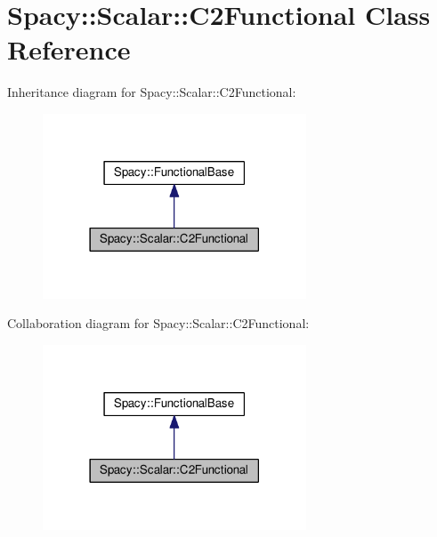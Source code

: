 \hypertarget{classSpacy_1_1Scalar_1_1C2Functional}{\section{Spacy\-:\-:Scalar\-:\-:C2\-Functional Class Reference}
\label{classSpacy_1_1Scalar_1_1C2Functional}
}


Inheritance diagram for Spacy\-:\-:Scalar\-:\-:C2\-Functional\-:
\nopagebreak
\begin{figure}[H]
\begin{center}
\leavevmode
\includegraphics[width=222pt]{classSpacy_1_1Scalar_1_1C2Functional__inherit__graph}
\end{center}
\end{figure}


Collaboration diagram for Spacy\-:\-:Scalar\-:\-:C2\-Functional\-:
\nopagebreak
\begin{figure}[H]
\begin{center}
\leavevmode
\includegraphics[width=222pt]{classSpacy_1_1Scalar_1_1C2Functional__coll__graph}
\end{center}
\end{figure}
